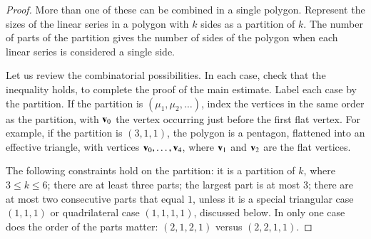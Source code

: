 \begin{proof}
More than one of these can be combined in a single polygon.   Represent the sizes of the linear series in a polygon with $k$ sides as a partition of $k$.
The number of parts of the partition gives the number of sides of the polygon when each linear series is considered a single side. 
%

Let us review the combinatorial possibilities.  In each case,  check that the inequality holds, to complete the proof of the main estimate.  Label each 
case by the partition.  If the partition is $(\mu_1,\mu_2,\ldots)$, 
index the vertices in the same order as the partition, with ${\mathbf v}_0$
the vertex occurring just before the first flat vertex.  For example,
if the partition is $(3,1,1)$, the polygon is a pentagon, flattened into
an effective triangle, with vertices ${\mathbf v}_0,\ldots,{\mathbf v}_4$, where ${\mathbf v}_1$ and ${\mathbf v}_2$
are the flat vertices.
%

The following constraints hold on the partition: it is
a partition of $k$, where $3\le k\le 6$; there
are at least three parts; the largest part is at most $3$;  there are
at most two consecutive parts that equal $1$, unless it is a special triangular case $(1,1,1)$ or
quadrilateral case $(1,1,1,1)$, discussed below.  In only one case
does the order of the parts matter: $(2,1,2,1)$ versus $(2,2,1,1)$.





\end{proof}
